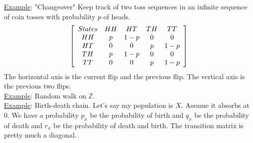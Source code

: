     \noindent\underline{Example}: "Changeover" Keep track of two toss sequences
      in an infinite sequence of coin tosses with probability $p$ of heads.
      $$
        \left[ 
          \begin{array}{c c c c c} 
            States & HH & HT & TH & TT\\
            HH & p & 1 - p & 0 & 0\\
            HT & 0 & 0 & p & 1 - p\\
            TH & p & 1 - p & 0 & 0\\
            TT & 0 & 0 & p & 1 - p\\
          \end{array}
        \right]
      $$
      The horizontal axis is the current flip and the previous flip. The 
      vertical axis is the previous two flips.\\

    \noindent\underline{Example}: Random walk on $\mathbb{Z}$.\\

    \noindent\underline{Example}: Birth-death chain. Let's say my population
    is $X$. Assume it absorbs at 0. We have a probability $p_x$ be the 
    probability of birth and $q_x$ be the probability of death and $r_x$
    be the probability of death and birth. The transition matrix is pretty much
    a diagonal.
